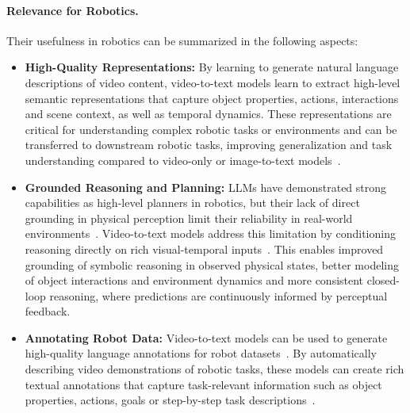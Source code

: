 \paragraph{Relevance for Robotics.}
Their usefulness in robotics can be summarized in the following aspects:

\begin{itemize}
    \item \textbf{High-Quality Representations:}
    By learning to generate natural language descriptions of video content, video-to-text models learn to extract high-level semantic representations that capture object properties, actions, interactions and scene context, as well as temporal dynamics. These representations are critical for understanding complex robotic tasks or environments and can be transferred to downstream robotic tasks, improving generalization and task understanding compared to video-only or image-to-text models~\cite{McCarthy_2025}. 

    \item \textbf{Grounded Reasoning and Planning:}
    \acp{LLM} have demonstrated strong capabilities as high-level planners in robotics, but their lack of direct grounding in physical perception limit their reliability in real-world environments~\cite{Ahn2022DoAI}.
    Video-to-text models address this limitation by conditioning reasoning directly on rich visual-temporal inputs~\cite{Wake2023GPT4VisionFR, Huang2026RoboStreamWS, Nguyen2019V2CNetAD,McCarthy_2025}. This enables improved grounding of symbolic reasoning in observed physical states, better modeling of object interactions and environment dynamics and more consistent closed-loop reasoning, where predictions are continuously informed by perceptual feedback.

    \item \textbf{Annotating Robot Data:}
    Video-to-text models can be used to generate high-quality language annotations for robot datasets~\cite{Blank2024ScalingRP}. By automatically describing video demonstrations of robotic tasks, these models can create rich textual annotations that capture task-relevant information such as object properties, actions, goals or step-by-step task descriptions~\cite{Team2024OctoAO}. 


\end{itemize}
